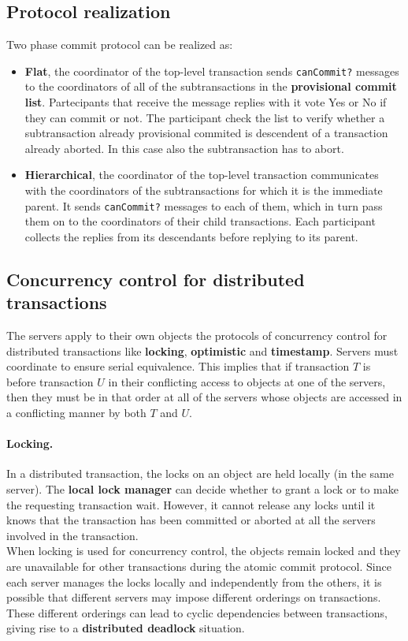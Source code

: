 \subsection{Protocol realization}

Two phase commit protocol can be realized as:
\begin{itemize}
	\item \textbf{Flat}, the coordinator of the top-level transaction sends \verb|canCommit?| messages to the coordinators of all of the subtransactions in the \textbf{provisional commit list}. Partecipants that receive the message replies with it vote Yes or No if they can commit or not. The participant check the list to verify whether a subtransaction already provisional commited is descendent of a transaction already aborted. In this case also the subtransaction has to abort.
	
	
	
	\item \textbf{Hierarchical}, the coordinator of the top-level transaction communicates with the coordinators of the subtransactions for which it is the immediate parent. It sends \verb|canCommit?| messages to each of them, which in turn pass them on to the coordinators of their child transactions. Each participant collects the replies from its descendants before replying to its parent.
\end{itemize}


\subsection{Concurrency control for distributed transactions}
The servers apply to their own objects the protocols of concurrency control for
distributed transactions like \textbf{locking}, \textbf{optimistic} and \textbf{timestamp}. Servers must coordinate to ensure serial equivalence. This implies that if transaction $T$ is before transaction $U$ in their conflicting access to objects at one of the servers, then they must be in that order at all of the servers whose objects are accessed in a conflicting manner by both $T$ and $U$.

\paragraph*{Locking.} In a distributed transaction, the locks on an object are held locally (in the same server). The \textbf{local lock manager} can decide whether to grant a lock or to make the requesting transaction wait. However, it cannot release any locks until it knows that the transaction has been committed or aborted at all the servers involved in the transaction.\\
When locking is used for concurrency control, the objects remain locked and they are unavailable for other transactions during the atomic commit protocol. Since each server manages the locks locally and independently from the others, it is possible that different servers may impose different orderings on transactions. These different orderings can lead to cyclic dependencies between transactions, giving rise to a \textbf{distributed deadlock} situation.

